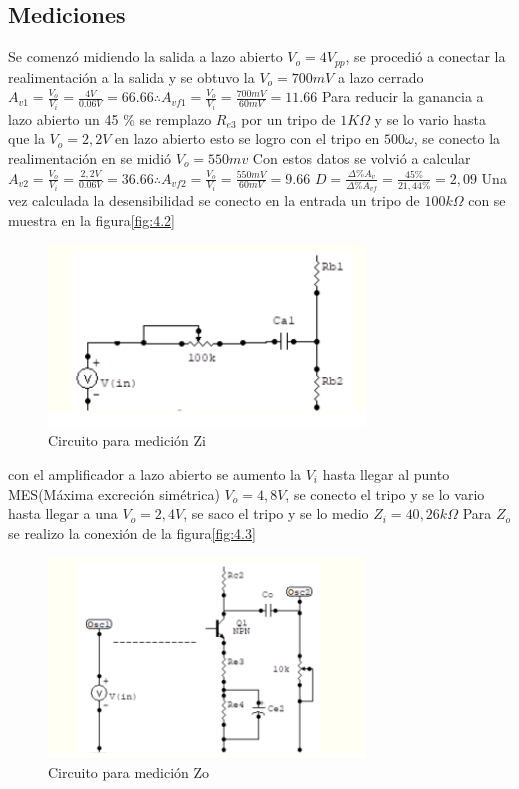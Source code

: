 \documentclass[12pt, letterpaper]{article}
\begin{document}
\subsection{Mediciones}
Se comenzó midiendo la salida a lazo abierto $V_o=4V_{pp}$, se procedió a conectar la realimentación a la salida y se obtuvo la $V_o=700mV$ a lazo cerrado
\singlespacing
$A_{v1}=\frac{V_o}{V_{i}}=\frac{4V}{0.06V}=66.66 \therefore A_{vf1}=\frac{V_o}{V_{i}}=\frac{700mV}{60mV}=11.66$
\singlespacing
Para reducir la ganancia a lazo abierto un 45 \% se remplazo $R_{e3}$ por un tripo de $1K\Omega$ y se lo vario hasta que la $V_o=2,2V$ en lazo abierto esto se logro con el tripo en $500\omega$, se conecto la realimentación en se midió $V_o=550mv$
\singlespacing
Con estos datos se volvió a calcular $A_{v2}=\frac{V_o}{V_{i}}=\frac{2,2V}{0.06V}=36.66 \therefore A_{vf2}=\frac{V_o}{V_{i}}=\frac{550mV}{60mV}=9.66$
\singlespacing
$D=\frac{\Delta \% A_v}{\Delta \% A_{vf}}=\frac{45\%}{21,44\%}=2,09$
\singlespacing
Una vez calculada la desensibilidad se conecto en la entrada un tripo de $100k\Omega$ con se muestra en la figura\ref{fig:4.2}
\singlespacing
\begin{figure}[h!]
	\centering
	\includegraphics[width=0.75\textwidth]{Imagenes/zi.png}
	\caption{Circuito para medición Zi}
	\label{fig:5}
\end{figure}
con el amplificador a lazo abierto se aumento la $V_i$ hasta llegar al punto MES(Máxima excreción simétrica) $V_o=4,8V$, se conecto el tripo y se lo vario hasta llegar a una $V_o=2,4V$, se saco el tripo y se lo medio
\singlespacing
$Z_i=40,26k\Omega$
\singlespacing
Para $Z_o$ se realizo la conexión de la figura\ref{fig:4.3}
\singlespacing
\begin{figure}[h!]
	\centering
	\includegraphics[width=0.75\textwidth]{Imagenes/zo.png}
	\caption{Circuito para medición Zo}
	\label{fig:6}
\end{figure}

\label{LastPage}
\end{document}
